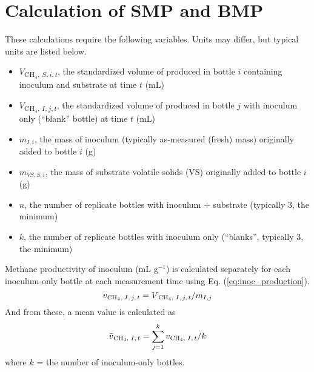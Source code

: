 \documentclass[]{article}
\begin{document}
\section{Calculation of SMP and BMP}
These calculations require the following variables.
Units may differ, but typical units are listed below.
\begin{itemize}
  \item $V$\textsubscript{{CH$_4$, $S, i, t$}}, the standardized volume of  produced in bottle $i$ containing inoculum and substrate at time $t$ (mL)
  \item $V$\textsubscript{{CH$_4$, $I, j, t$}}, the standardized volume of  produced in bottle $j$ with inoculum only (``blank'' bottle) at time $t$ (mL)
  \item $m_{I, i}$, the mass of inoculum (typically as-measured (fresh) mass) originally added to bottle $i$ (g)
  \item $m_{VS, S, i}$, the mass of substrate volatile solids (VS) originally added to bottle $i$ (g)
  \item $n$, the number of replicate bottles with inoculum + substrate (typically 3, the minimum)
  \item $k$, the number of replicate bottles with inoculum only (``blanks'', typically 3, the minimum)
\end{itemize}

Methane productivity of inoculum (mL g$^{-1}$) is calculated separately for each inoculum-only bottle at each measurement time using Eq. (\ref{eq:inoc_production}).
\begin{equation}
  \label{eq:inoc_production}
  v\textsubscript{{CH$_4$, $I, j, t$}} = V\textsubscript{{CH$_4$, $I, j, t$}} / m_{I, j} 
\end{equation}
And from these, a mean value is calculated as 
\begin{equation}
  \label{eq:inoc_productivity}
  \bar{v}\textsubscript{{CH$_4$, $I, t$}} = \sum_{j = 1} ^k v\textsubscript{{CH$_4$, $I, t$}} / k
\end{equation}
where $k$ = the number of inoculum-only bottles.
\end{document}
